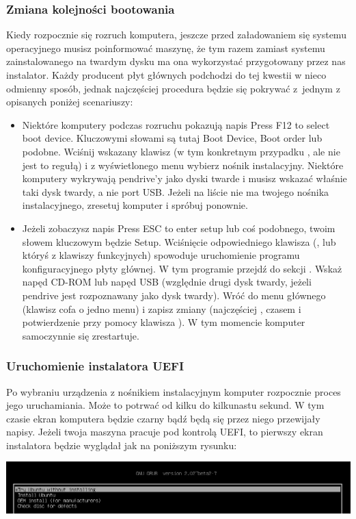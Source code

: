 \subsubsection{Zmiana kolejności bootowania}
Kiedy rozpocznie się rozruch komputera, jeszcze przed załadowaniem się systemu operacyjnego musisz poinformować maszynę, że tym razem zamiast systemu zainstalowanego na twardym dysku ma ona wykorzystać przygotowany przez nas instalator. Każdy producent płyt głównych podchodzi do tej kwestii w nieco odmienny sposób, jednak najczęściej procedura będzie się pokrywać z~jednym z opisanych poniżej scenariuszy:
\begin{itemize}
\item Niektóre komputery podczas rozruchu pokazują napis \textcolor{ubuntu_orange}{Press F12 to select boot device}. Kluczowymi słowami są tutaj \textcolor{ubuntu_orange}{Boot Device}, \textcolor{ubuntu_orange}{Boot order} lub podobne. Wciśnij wskazany klawisz (w tym konkretnym przypadku , ale nie jest to regułą) i z wyświetlonego menu wybierz nośnik instalacyjny. Niektóre komputery wykrywają pendrive'y jako dyski twarde i musisz wskazać właśnie taki dysk twardy, a nie port USB. Jeżeli na liście nie ma twojego nośnika instalacyjnego, zresetuj komputer i spróbuj ponownie.
\item Jeżeli zobaczysz napis \textcolor{ubuntu_orange}{Press ESC to enter setup} lub coś podobnego, twoim słowem kluczowym będzie \textcolor{ubuntu_orange}{Setup}. Wciśnięcie odpowiedniego klawisza (\keys{\escwin}, \keys{\delwin} lub któryś z klawiszy funkcyjnych) spowoduje uruchomienie programu konfiguracyjnego płyty głównej. W tym programie przejdź do sekcji . Wskaż napęd CD-ROM lub napęd USB (względnie drugi dysk twardy, jeżeli pendrive jest rozpoznawany jako dysk twardy). Wróć do menu głównego (klawisz \keys{\escwin} cofa o jedno menu) i zapisz zmiany (najczęściej , czasem \keys{\escwin} i potwierdzenie przy pomocy klawisza ). W tym momencie komputer samoczynnie się zrestartuje.
\end{itemize}
\subsubsection{Uruchomienie instalatora UEFI}
\label{instalacja_uruchomienie_uefi}
Po wybraniu urządzenia z nośnikiem instalacyjnym komputer rozpocznie proces jego uruchamiania. Może to potrwać od kilku do kilkunastu sekund. W tym czasie ekran komputera będzie czarny bądź będą się przez niego przewijały napisy. Jeżeli twoja maszyna pracuje pod kontrolą UEFI, to pierwszy ekran instalatora będzie wyglądał jak na poniższym rysunku:
\begin{center}
        \includegraphics[width=\linewidth]{images/instalacja_UEFI_boot.png}
\end{center}

